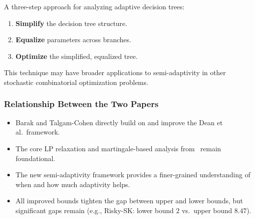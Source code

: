 A three-step approach for analyzing adaptive decision trees:
\begin{enumerate}
    \item \textbf{Simplify} the decision tree structure.
    \item \textbf{Equalize} parameters across branches.
    \item \textbf{Optimize} the simplified, equalized tree.
\end{enumerate}
This technique may have broader applications to semi-adaptivity in other stochastic combinatorial optimization problems.

\subsubsection{Relationship Between the Two Papers}

\begin{itemize}
    \item Barak and Talgam-Cohen directly build on and improve the Dean et al.\ framework.
    \item The core LP relaxation and martingale-based analysis from~\cite{DeanGoemansVondrak2008} remain foundational.
    \item The new semi-adaptivity framework provides a finer-grained understanding of when and how much adaptivity helps.
    \item All improved bounds tighten the gap between upper and lower bounds, but significant gaps remain (e.g., Risky-SK: lower bound $2$ vs.\ upper bound $8.47$).
\end{itemize}
